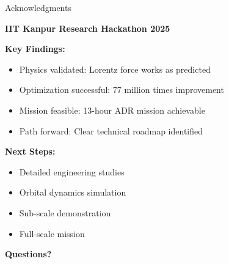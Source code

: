 \documentclass[11pt]{beamer}
\begin{document}
\begin{frame}{Acknowledgments}

\textbf{IIT Kanpur Research Hackathon 2025}

\vspace{0.5cm}

\textbf{Key Findings:}
\begin{itemize}
\item Physics validated: Lorentz force works as predicted
\item Optimization successful: 77 million times improvement
\item Mission feasible: 13-hour ADR mission achievable
\item Path forward: Clear technical roadmap identified
\end{itemize}

\vspace{0.5cm}

\textbf{Next Steps:}
\begin{itemize}
\item Detailed engineering studies
\item Orbital dynamics simulation
\item Sub-scale demonstration
\item Full-scale mission
\end{itemize}

\vspace{0.5cm}

\centering
\Large{\textbf{Questions?}}

\end{frame}
\end{document}
